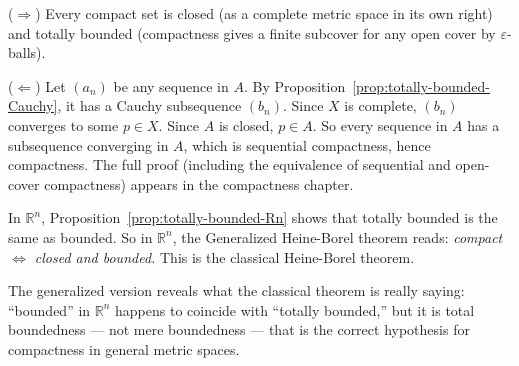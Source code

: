 \begin{remark*}
($\Rightarrow$) Every compact set is closed (as a complete metric space
in its own right) and totally bounded (compactness gives a finite subcover
for any open cover by $\varepsilon$-balls).

($\Leftarrow$) Let $(a_n)$ be any sequence in $A$.
By Proposition~\ref{prop:totally-bounded-Cauchy}, it has a Cauchy
subsequence $(b_n)$.
Since $X$ is complete, $(b_n)$ converges to some $p \in X$.
Since $A$ is closed, $p \in A$.
So every sequence in $A$ has a subsequence converging in $A$,
which is sequential compactness, hence compactness.
The full proof (including the equivalence of sequential and open-cover compactness)
appears in the compactness chapter.
\end{remark*}

\begin{remark*}
In $\mathbb{R}^n$, Proposition~\ref{prop:totally-bounded-Rn} shows
that totally bounded is the same as bounded.
So in $\mathbb{R}^n$, the Generalized Heine-Borel theorem reads:
\emph{compact $\iff$ closed and bounded.}
This is the classical Heine-Borel theorem.

The generalized version reveals what the classical theorem is really saying:
``bounded'' in $\mathbb{R}^n$ happens to coincide with
``totally bounded,'' but it is total boundedness --- not mere boundedness ---
that is the correct hypothesis for compactness in general metric spaces.
\end{remark*}

